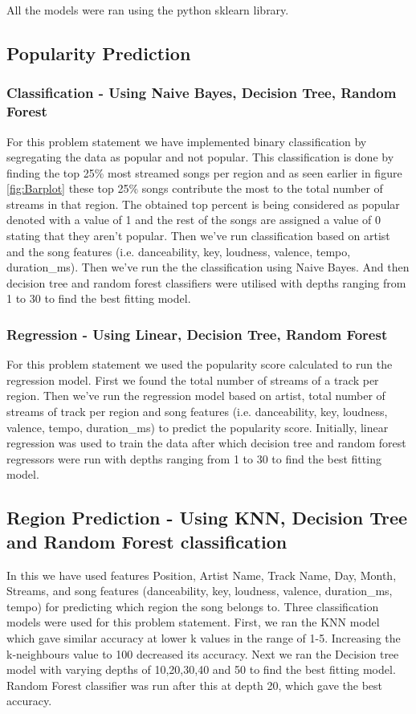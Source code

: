 \documentclass{article}
\begin{document}
All the models were ran using the python sklearn library.


\subsection{Popularity Prediction}

\subsubsection{Classification - Using Naive Bayes, Decision Tree, Random Forest}
For this problem statement we have implemented binary classification by segregating the data as popular and not popular. This classification is done by finding the top 25\% most streamed songs per region and as seen earlier in figure \ref{fig:Barplot}   these top 25\% songs contribute the most to the total number of streams in that region. The obtained top percent is being considered as popular denoted with a value of 1 and the rest of the songs are assigned a value of 0 stating that they aren't popular. 
Then we've run classification based on artist and the song features (i.e. danceability, key, loudness, valence, tempo, duration\_ms). Then we've run the the classification using Naive Bayes. And then decision tree and random forest classifiers were utilised with depths ranging from 1 to 30 to find the best fitting model. 

\subsubsection{Regression - Using Linear, Decision Tree, Random Forest}
For this problem statement we used the popularity score calculated to run the regression model. First we found the total number of streams of a track per region. Then we've run the regression model based on artist, total number of streams of track per region and song features (i.e. danceability, key, loudness, valence, tempo, duration\_ms) to predict the popularity score. Initially, linear regression was used to train the data after which decision tree and random forest regressors were run with depths ranging from 1 to 30 to find the best fitting model. 

\subsection{Region Prediction - Using KNN, Decision Tree and Random Forest classification}

In this we have used features Position, Artist Name, Track Name, Day, Month, Streams, and song features (danceability, key, loudness, valence, duration\_ms, tempo) for predicting which region the song belongs to. Three classification models were used for this problem statement.
First, we  ran the KNN model which gave similar accuracy at lower k values in the range of 1-5. Increasing the k-neighbours value to 100 decreased its accuracy.
Next we ran the Decision tree model with varying depths of 10,20,30,40 and 50 to find the best fitting model.
Random Forest classifier was run after this at depth 20, which gave the best accuracy. 
\end{document}
